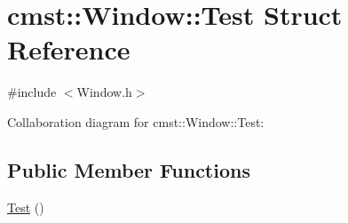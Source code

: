 \hypertarget{structcmst_1_1_window_1_1_test}{}\section{cmst::Window::Test Struct Reference}
\label{structcmst_1_1_window_1_1_test}


{\ttfamily \#include $<$Window.h$>$}



Collaboration diagram for cmst::Window::Test:
\subsection*{Public Member Functions}
\begin{DoxyCompactItemize}
\item 
\hyperlink{structcmst_1_1_window_1_1_test_af1e9b5fcdbaa7d5ba758571e06e41952}{Test} ()
\end{DoxyCompactItemize}
